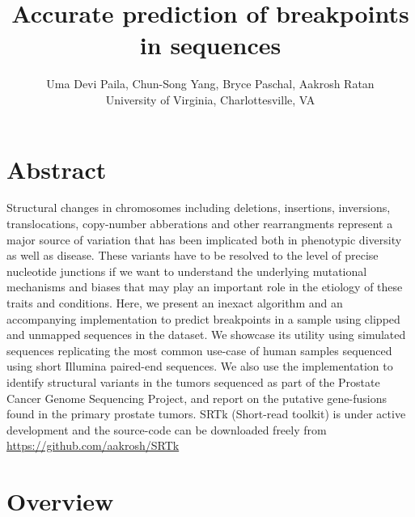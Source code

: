 \documentclass[a0,final]{a0poster}
\title{Accurate prediction of breakpoints in sequences}
\author{Uma Devi Paila, Chun-Song Yang, Bryce Paschal, Aakrosh Ratan\\
University of Virginia, Charlottesville, VA}
\begin{document}
\hspace{-3cm}						%
\colorbox{boxcol}{					%
\begin{minipage}{1189mm}		    %
\maketitle
\end{minipage}
}
\vspace{1cm}

\begin{multicols}{2}						%
\raggedcolumns							    %

\section*{Abstract}
Structural changes in chromosomes including deletions, insertions, inversions,
translocations, copy-number abberations and other rearrangments represent a
major source of variation that has been implicated both in phenotypic diversity
as well as disease. These variants have to be resolved to the level of precise
nucleotide junctions if we want to understand the underlying mutational
mechanisms and biases that may play an important role in the etiology of these
traits and conditions. Here, we present an inexact algorithm and an accompanying
implementation to predict breakpoints in a sample using clipped and
unmapped sequences in the dataset. We showcase its utility using simulated
sequences replicating the most common use-case of human samples sequenced using
short Illumina paired-end sequences.  We also use the implementation to identify
structural variants in the tumors sequenced as part of the Prostate Cancer
Genome Sequencing Project, and report on the putative gene-fusions found in the 
primary prostate tumors. SRTk (Short-read toolkit) is under active development 
and the source-code can be downloaded freely from \url{https://github.com/aakrosh/SRTk}

\section*{Overview}


\end{multicols}
\end{document}
